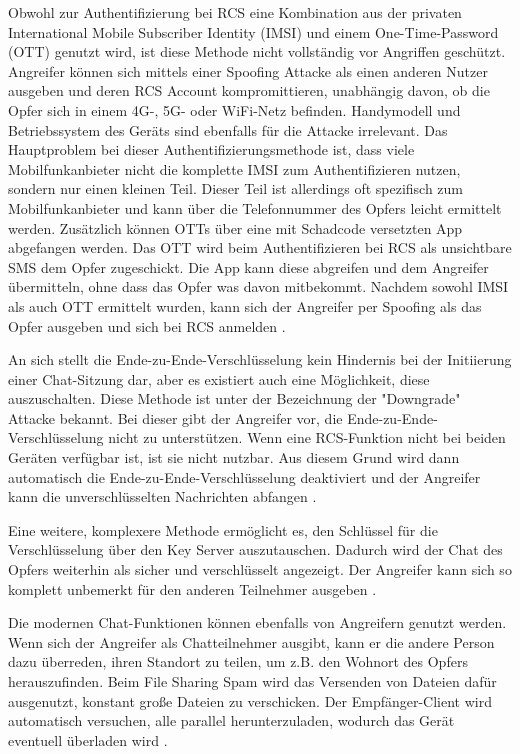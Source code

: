 \documentclass[conference]{IEEEtran}
\begin{document}
Obwohl zur Authentifizierung bei RCS eine Kombination aus der privaten International Mobile Subscriber Identity (IMSI) und einem One-Time-Password (OTT) genutzt wird, ist diese Methode nicht vollständig vor Angriffen geschützt.
Angreifer können sich mittels einer Spoofing Attacke als einen anderen Nutzer ausgeben und deren RCS Account kompromittieren, unabhängig davon, ob die Opfer sich in einem 4G-, 5G- oder WiFi-Netz befinden.
Handymodell und Betriebssystem des Geräts sind ebenfalls für die Attacke irrelevant.
Das Hauptproblem bei dieser Authentifizierungsmethode ist, dass viele Mobilfunkanbieter nicht die komplette IMSI zum Authentifizieren nutzen, sondern nur einen kleinen Teil.
Dieser Teil ist allerdings oft spezifisch zum Mobilfunkanbieter und kann über die Telefonnummer des Opfers leicht ermittelt werden.
Zusätzlich können OTTs über eine mit Schadcode versetzten App abgefangen werden.
Das OTT wird beim Authentifizieren bei RCS als unsichtbare SMS dem Opfer zugeschickt.
Die App kann diese abgreifen und dem Angreifer übermitteln, ohne dass das Opfer was davon mitbekommt.
Nachdem sowohl IMSI als auch OTT ermittelt wurden, kann sich der Angreifer per Spoofing als das Opfer ausgeben und sich bei RCS anmelden \cite{5gmsg}.

An sich stellt die Ende-zu-Ende-Verschlüsselung kein Hindernis bei der Initiierung einer Chat-Sitzung dar, aber es existiert auch eine Möglichkeit, diese auszuschalten.
Diese Methode ist unter der Bezeichnung der "Downgrade" Attacke bekannt.
Bei dieser gibt der Angreifer vor, die Ende-zu-Ende-Verschlüsselung nicht zu unterstützen.
Wenn eine RCS-Funktion nicht bei beiden Geräten verfügbar ist, ist sie nicht nutzbar.
Aus diesem Grund wird dann automatisch die Ende-zu-Ende-Verschlüsselung deaktiviert und der Angreifer kann die unverschlüsselten Nachrichten abfangen \cite{5gmsg}.

Eine weitere, komplexere Methode ermöglicht es, den Schlüssel für die Verschlüsselung über den Key Server auszutauschen.
Dadurch wird der Chat des Opfers weiterhin als sicher und verschlüsselt angezeigt.
Der Angreifer kann sich so komplett unbemerkt für den anderen Teilnehmer ausgeben \cite{5gmsg}.

Die modernen Chat-Funktionen können ebenfalls von Angreifern genutzt werden.
Wenn sich der Angreifer als Chatteilnehmer ausgibt, kann er die andere Person dazu überreden, ihren Standort zu teilen, um z.B. den Wohnort des Opfers herauszufinden.
Beim File Sharing Spam wird das Versenden von Dateien dafür ausgenutzt, konstant große Dateien zu verschicken.
Der Empfänger-Client wird automatisch versuchen, alle parallel herunterzuladen, wodurch das Gerät eventuell überladen wird \cite{5gmsg}.
\end{document}
